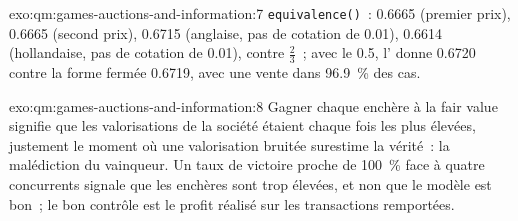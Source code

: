 \begin{solution}{exo:qm:games-auctions-and-information:7}
\texttt{equivalence()}~: 0.6665 (premier prix), 0.6665 (second prix), 0.6715 (anglaise, pas de cotation de 0.01), 0.6614 (hollandaise, pas de cotation de 0.01), contre $\frac23$~; avec le  0.5, l' donne 0.6720 contre la
forme fermée 0.6719, avec une vente dans 96.9~\% des cas.
\end{solution}

\begin{solution}{exo:qm:games-auctions-and-information:8}
Gagner chaque enchère à la fair value signifie que les valorisations de la société étaient chaque fois les plus élevées, justement le moment où une valorisation bruitée surestime la vérité~: la malédiction du vainqueur. Un taux de victoire proche de 100~\%
face à quatre concurrents signale que les enchères sont trop élevées, et non que le modèle est bon~; le bon contrôle est le profit réalisé sur les transactions remportées.
\end{solution}

